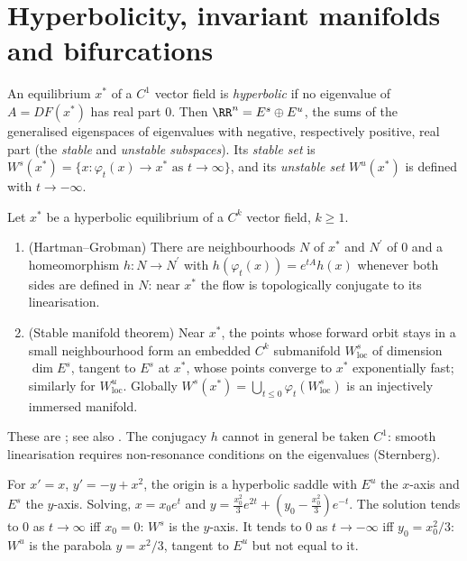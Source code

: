\section{Hyperbolicity, invariant manifolds and bifurcations}\label{ordinary-differential-equations:section-hyperbolic}

\begin{definition}\label{ordinary-differential-equations:definition-hyperbolic}
An equilibrium $x^*$ of a $C^1$ vector field is \emph{hyperbolic} if no eigenvalue of $A = DF(x^*)$ has real part $0$. Then $\RR^n = E^s \oplus E^u$, the sums of the generalised eigenspaces of eigenvalues with negative, respectively
positive, real part (the \emph{stable} and \emph{unstable subspaces}). Its \emph{stable set} is $W^s(x^*) = \{x : \varphi_t(x) \to x^* \text{ as } t \to \infty\}$, and its \emph{unstable set} $W^u(x^*)$ is defined with $t \to -\infty$.
\end{definition}

\begin{theorem}\label{ordinary-differential-equations:theorem-hartman-grobman}
Let $x^*$ be a hyperbolic equilibrium of a $C^k$ vector field, $k \geq 1$.
\begin{enumerate}
\item (Hartman--Grobman) There are neighbourhoods $N$ of $x^*$ and $N^{\prime}$ of $0$ and a homeomorphism $h \colon N \to N^{\prime}$ with $h(\varphi_t(x)) = e^{tA}h(x)$ whenever both sides are defined in $N$: near $x^*$ the flow is topologically
conjugate to its linearisation.
\item (Stable manifold theorem) Near $x^*$, the points whose forward orbit stays in a small neighbourhood form an embedded $C^k$ submanifold $W^s_{\mathrm{loc}}$ of dimension $\dim E^s$, tangent to $E^s$ at $x^*$, whose points converge to
$x^*$ exponentially fast; similarly for $W^u_{\mathrm{loc}}$. Globally $W^s(x^*) = \bigcup_{t \leq 0}\varphi_t(W^s_{\mathrm{loc}})$ is an injectively immersed manifold.
\end{enumerate}
\end{theorem}

These are \cite[Chapter IX]{hartman-ode}; see also \cite[Chapter 9]{teschl-ode}. The conjugacy $h$ cannot in general be taken $C^1$: smooth linearisation requires non-resonance conditions on the eigenvalues (Sternberg).

\begin{example}\label{ordinary-differential-equations:example-saddle-manifolds}
For $x' = x$, $y' = -y + x^2$, the origin is a hyperbolic saddle with $E^u$ the $x$-axis and $E^s$ the $y$-axis. Solving, $x = x_0e^t$ and $y = \frac{x_0^2}{3}e^{2t} + (y_0 - \frac{x_0^2}{3})e^{-t}$. The solution tends to $0$ as $t \to \infty$
iff $x_0 = 0$: $W^s$ is the $y$-axis. It tends to $0$ as $t \to -\infty$ iff $y_0 = x_0^2/3$: $W^u$ is the parabola $y = x^2/3$, tangent to $E^u$ but not equal to it.
\end{example}

